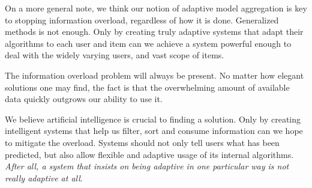 On a more general note, we think our notion of adaptive model
aggregation is key to stopping information overload,
regardless of how it is done.
Generalized methods is not enough.
Only by creating truly adaptive systems that adapt their
algorithms to each user and item can we achieve a 
system powerful enough to deal with the widely
varying users, and vast scope of items.

The information overload problem will always be present.
No matter how elegant solutions one may find,
the fact is that the overwhelming amount of available data
quickly outgrows our ability to use it.

We believe artificial intelligence is crucial to finding a solution.
Only by creating intelligent systems that 
help us filter, sort and consume information can we hope 
to mitigate the overload.
Systems should not only tell users what has been predicted,
but also allow flexible and adaptive usage of its internal algorithms.
\emph{After all, a system that insists on being adaptive
in one particular way is not really adaptive at all}.

